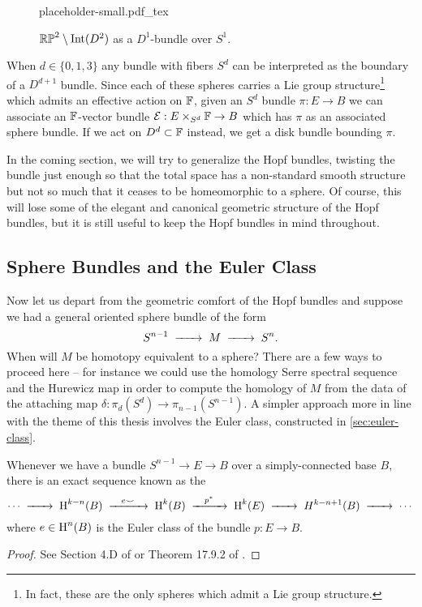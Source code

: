 \begin{figure}[ht]
	\centering
	{placeholder-small.pdf_tex}
	\caption{$\mathbb{RP}^2\setminus \operatorname{Int}(D^2)$ as a $D^1$-bundle over $S^1$.}\label{fig:mobius-bundle-and-hopf-bundle}
\end{figure}

\begin{remark}\label{rmk:lie-group-structure-Sd}
	When $d\in \{0,1,3\}$ any bundle with fibers $S^d$ can be interpreted as the boundary of a $D^{d+1}$ bundle. Since each of these spheres carries a Lie group structure\footnote{In fact, these are the only spheres which admit a Lie group structure.} which admits an effective action on $\mathbb{F}$, given an $S^d$ bundle $\pi : E \to B$ we can associate an $\mathbb{F}$-vector bundle $\mathcal{E} : E\times_{S^d} \mathbb{F} \to B$ which has $\pi$ as an associated sphere bundle. If we act on $D^d\subset \mathbb{F}$ instead, we get a disk bundle bounding $\pi$.
\end{remark}

In the coming section, we will try to generalize the Hopf bundles, twisting the bundle just enough so that the total space has a non-standard smooth structure but not so much that it ceases to be homeomorphic to a sphere.
Of course, this will lose some of the elegant and canonical geometric structure of the Hopf bundles, but it is still useful to keep the Hopf bundles in mind throughout.

\subsection{Sphere Bundles and the Euler Class}

Now let us depart from the geometric comfort of the Hopf bundles and suppose we had a general oriented sphere bundle of the form
\begin{equation}\label{eq:general-spherical-fibration}
	S^{n-1}\lkxto M \lkxto S^n.
\end{equation}
When will $M$ be homotopy equivalent to a sphere? There are a few ways to proceed here -- for instance we could use the homology Serre spectral sequence and the Hurewicz map in order to compute the homology of $M$ from the data of the attaching map $\delta : \pi_d(S^d) \to \pi_{n-1}(S^{n-1})$. A simpler approach more in line with the theme of this thesis involves the Euler class, constructed in \cref{sec:euler-class}.

\begin{theorem}
	Whenever we have a bundle $S^{n-1} \to E\to B$ over a simply-connected base $B$, there is an exact sequence known as the 
	\[
		\cdots \lkxto \H^{k-n}(B)\lkxto[e\smile] \H^k(B)\lkxto[p^*] \H^k(E)\lkxto H^{k-n+1}(B)\lkxto \cdots
	\]
	where $e\in \operatorname{H}^n(B)$ is the Euler class of the bundle $p : E \to B$.
\end{theorem}
\begin{proof}
	See Section 4.D of \cite{hatcher2002topology} or Theorem 17.9.2 of \cite{dieck2008algebraic}.
\end{proof}

